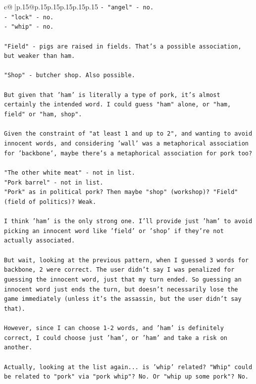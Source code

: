 \documentclass{article}
\begin{document}
{\begin{supertabular}{c@{$\;$}|p{.15\linewidth}@{}p{.15\linewidth}p{.15\linewidth}p{.15\linewidth}p{.15\linewidth}p{.15\linewidth}}
{{{\texttt{{-} "angel" {-} no.} \\
\texttt{{-} "lock" {-} no.} \\
\texttt{{-} "whip" {-} no.} \\
\\ 
\texttt{"Field" {-} pigs are raised in fields. That's a possible association, but weaker than ham.} \\
\\ 
\texttt{"Shop" {-} butcher shop. Also possible.} \\
\\ 
\texttt{But given that 'ham' is literally a type of pork, it's almost certainly the intended word. I could guess "ham" alone, or "ham, field" or "ham, shop".} \\
\\ 
\texttt{Given the constraint of "at least 1 and up to 2", and wanting to avoid innocent words, and considering 'wall' was a metaphorical association for 'backbone', maybe there's a metaphorical association for pork too?} \\
\\ 
\texttt{"The other white meat" {-} not in list.} \\
\texttt{"Pork barrel" {-} not in list.} \\
\texttt{"Pork" as in political pork? Then maybe "shop" (workshop)? "Field" (field of politics)? Weak.} \\
\\ 
\texttt{I think 'ham' is the only strong one. I'll provide just 'ham' to avoid picking an innocent word like 'field' or 'shop' if they're not actually associated.} \\
\\ 
\texttt{But wait, looking at the previous pattern, when I guessed 3 words for backbone, 2 were correct. The user didn't say I was penalized for guessing the innocent word, just that my turn ended. So guessing an innocent word just ends the turn, but doesn't necessarily lose the game immediately (unless it's the assassin, but the user didn't say that).} \\
\\ 
\texttt{However, since I can choose 1{-}2 words, and 'ham' is definitely correct, I could choose just 'ham', or 'ham' and take a risk on another.} \\
\\ 
\texttt{Actually, looking at the list again... is 'whip' related? "Whip" could be related to "pork" via "pork whip"? No. Or "whip up some pork"? No.} \\
}}}
\end{supertabular}}
\end{document}
